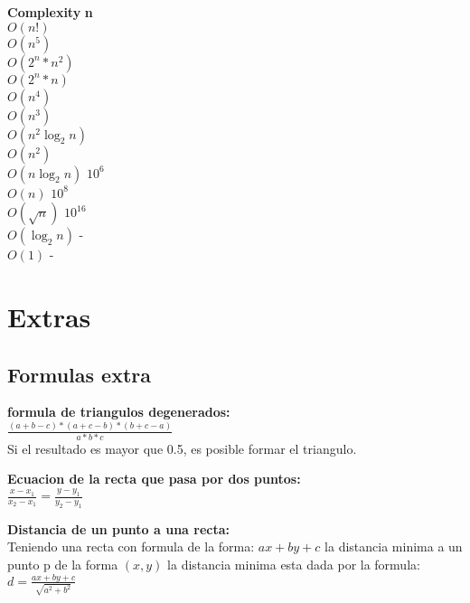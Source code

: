 \documentclass[10pt,landscape,twocolumn,a4paper,notitlepage]{article}
\begin{document}
\begin{tabbing}
\textbf{Complexity}\hspace{4cm} \=  \textbf{n}\hspace{3cm}   \\ 
$O(n!)$ \\ 
$O(n^{5})$ \\ 
$O(2^{n}*n^{2})$ \\ 
$O(2^{n}*n)$ \\ 
$O(n^{4})$ \\ 
$O(n^{3})$ \\ 
$O(n^{2}\log_{2}n)$ \\ 
$O(n^{2})$ \\ 
$O(n\log_{2}n)$ \> $10^{6}$\\ 
$O(n)$ \> $10^{8}$\\ 
$O(\sqrt{n})$ \> $10^{16}$\\ 
$O(\log_{2}n)$ \> -\\ 
$O(1)$ \> -\\ 
\end{tabbing}

	\section{Extras}
		\subsection{Formulas extra}
			\textbf{formula de triangulos degenerados:}\\
			\vspace{3mm}
			{\Large$\frac{(a + b - c) * (a + c - b) * (b  + c - a)} {a * b * c}$}
			\vspace{3mm}
			\\Si el resultado es mayor que 0.5, es posible formar el triangulo.
	
			\vspace{8mm}
			\textbf{Ecuacion de la recta que pasa por dos puntos:}\\
			\vspace{3mm}
			{\Large $\frac{x - x_{1}}{x_{2} - x_{1}} = \frac{y - y_{1}}{y_{2} - y_{1}}$}

			\vspace{8mm}
			\textbf{Distancia de un punto a una recta:}\\
			Teniendo una recta con formula de la forma: $ax + by + c$ la distancia minima
			a un punto p de la forma $(x, y)$ la distancia minima esta dada por la formula:\\
			\vspace{3mm}
			{\Large $d = \frac{ax + by + c}{\sqrt{a^{2} + b^{2}}}$}
			\vspace{3mm}
			
\end{document}
